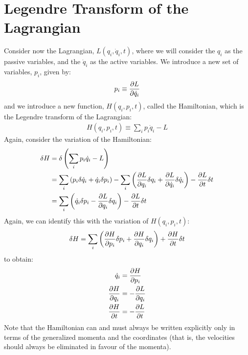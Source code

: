 \section{Legendre Transform of the Lagrangian}
Consider now the Lagrangian, $L(q_i,\dot{q}_i,t)$, where we will consider the $q_i$ as the passive variables, and the $\dot{q}_i$ as the active variables. We introduce a new set of variables, $p_i$, given by:
\begin{align}
p_i\equiv\frac{\partial L}{\partial \dot q_i}
\end{align}
and we introduce a new function, $H(q_i,p_i,t)$, called the Hamiltonian, which is the Legendre transform of the Lagrangian:
\begin{align}
H(q_i,p_i,t)\equiv \sum_ip_i\dot q_i-L
\end{align}
Again, consider the variation of the Hamiltonian:
\begin{align}
\delta H &= \delta \left(\sum_ip_i\dot q_i-L  \right)\nonumber\\
&=\sum_i\left( p_i\delta \dot q_i + \dot q_i \delta p_i \right)-\sum_i\left(\frac{\partial L}{\partial q_i}\delta q_i+\frac{\partial L}{\partial \dot q_i}\delta \dot q_i\right)-\frac{\partial L}{\partial t}\delta t \nonumber\\
&=\sum_i\left( \dot q_i\delta p_i -\frac{\partial L}{\partial q_i}\delta q_i \right)- \frac{\partial L}{\partial t}\delta t
\end{align}
Again, we can identify this with the variation of $H(q_i,p_i,t)$:
\begin{align}
\delta H = \sum_i\left(\frac{\partial H}{\partial p_i} \delta p_i+\frac{\partial H}{\partial q_i}\delta q_i \right)+\frac{\partial H}{\partial t}\delta t
\end{align}
to obtain:
\begin{align}
\dot q_i&=\frac{\partial H}{\partial p_i} \nonumber\\
\frac{\partial H}{\partial q_i}&=-\frac{\partial L}{\partial q_i} \nonumber\\
\frac{\partial H}{\partial t}&=-\frac{\partial L}{\partial t}
\end{align}
Note that the Hamiltonian can and must always be written explicitly only in terms of the generalized momenta and the coordinates (that is, the velocities should always be eliminated in favour of the momenta).

